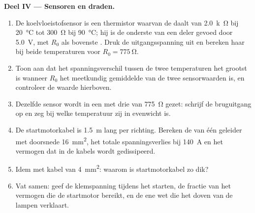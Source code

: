\begin{problem}
\medskip
\noindent\textbf{Deel IV --- Sensoren en draden.}
\begin{enumerate}[resume]
  \item De koelvloeistofsensor is een thermistor waarvan de  daalt van
        \qty{2.0}{k\ohm} bij \qty{20}{\degreeCelsius} tot \qty{300}{\ohm} bij
        \qty{90}{\degreeCelsius}; hij is de onderste  van een deler
        gevoed door \qty{5.0}{V}, met $R_0$ als bovenste . Druk de
        uitgangsspanning uit en bereken haar bij beide temperaturen voor
        $R_0 = \qty{775}{\ohm}$.
  \item Toon aan dat het spanningsverschil tussen de twee temperaturen het
        grootst is wanneer $R_0$ het meetkundig gemiddelde van de twee
        sensorwaarden is, en controleer de waarde hierboven.
  \item Dezelfde sensor wordt in een  met drie
         van \qty{775}{\ohm} gezet: schrijf de bruguitgang op en zeg bij
        welke temperatuur zij in evenwicht is.
  \item De startmotorkabel is \qty{1.5}{m} lang per richting. Bereken de
         van één geleider met doorsnede \qty{16}{mm^2}, het
        totale spanningsverlies bij \qty{140}{A} en het vermogen dat in de kabels
        wordt gedissipeerd.
  \item Idem met kabel van \qty{4}{mm^2}: waarom is startmotorkabel zo dik?
  \item Vat samen: geef de klemspanning tijdens het starten, de
        fractie van het vermogen die de startmotor bereikt, en de ene wet die
        het doven van de lampen verklaart.
\end{enumerate}
\end{problem}
